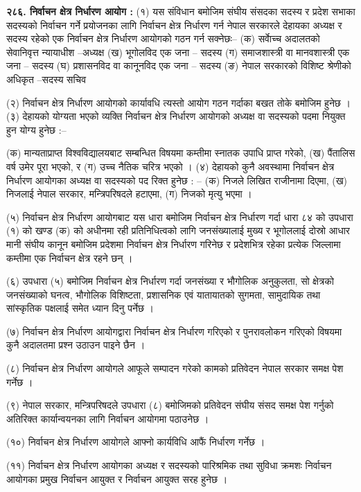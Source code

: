 \textbf{२८६. निर्वाचन क्षेत्र निर्धारण आयोग :} (१) यस संविधान बमोजिम संघीय संसदका सदस्य र प्रदेश सभाका सदस्यको निर्वाचन गर्ने प्रयोजनका लागि निर्वाचन क्षेत्र निर्धारण गर्न नेपाल सरकारले देहायका अध्यक्ष र सदस्य रहेको एक निर्वाचन क्षेत्र निर्धारण आयोगको गठन गर्न सक्नेछः–
(क) सर्वाेच्च अदालतको सेवानिवृत्त न्यायाधीश –अध्यक्ष
(ख) भूगोलविद एक जना – सदस्य
(ग) समाजशास्त्री वा मानवशास्त्री एक जना – सदस्य
(घ) प्रशासनविद वा कानूनविद एक जना – सदस्य
(ङ) नेपाल सरकारको विशिष्ट श्रेणीको अधिकृत –सदस्य सचिव

(२) निर्वाचन क्षेत्र निर्धारण आयोगको कार्यावधि त्यस्तो आयोग गठन गर्दाका बखत तोके बमोजिम हुनेछ ।
(३) देहायको योग्यता भएको व्यक्ति निर्वाचन क्षेत्र निर्धारण आयोगको अध्यक्ष वा सदस्यको पदमा नियुक्त हुन योग्य हुनेछ :–

(क) मान्यताप्राप्त विश्वविद्यालयबाट सम्बन्धित विषयमा कम्तीमा स्नातक उपाधि प्राप्त गरेको,
(ख) पैंतालिस वर्ष उमेर पूरा भएको, र
(ग) उच्च नैतिक चरित्र भएको ।
(४) देहायको कुनै अवस्थामा निर्वाचन क्षेत्र निर्धारण आयोगका अध्यक्ष वा सदस्यको पद रिक्त हुनेछ : –
(क) निजले लिखित राजीनामा दिएमा,
(ख) निजलाई नेपाल सरकार, मन्त्रिपरिषदले हटाएमा,
(ग) निजको मृत्यु भएमा ।

(५) निर्वाचन क्षेत्र निर्धारण आयोगबाट यस धारा बमोजिम निर्वाचन क्षेत्र निर्धारण गर्दा धारा ८४ को उपधारा (१) को खण्ड (क) को अधीनमा रही प्रतिनिधित्वको लागि जनसंख्यालाई मुख्य र भूगोललाई दोस्रो आधार मानी संघीय कानून बमोजिम प्रदेशमा निर्वाचन क्षेत्र निर्धारण गरिनेछ र प्रदेशभित्र रहेका प्रत्येक जिल्लामा कम्तीमा एक निर्वाचन क्षेत्र रहने छन् ।

(६) उपधारा (५) बमोजिम निर्वाचन क्षेत्र निर्धारण गर्दा जनसंख्या र भौगोलिक अनुकुलता, सो क्षेत्रको जनसंख्याको घनत्व, भौगोलिक विशिष्टता, प्रशासनिक एवं यातायातको सुगमता, सामुदायिक तथा सांस्कृतिक पक्षलाई समेत ध्यान दिनु पर्नेछ ।

(७) निर्वाचन क्षेत्र निर्धारण आयोगद्वारा निर्वाचन क्षेत्र निर्धारण गरिएको र पुनरावलोकन गरिएको विषयमा कुनै अदालतमा प्रश्न उठाउन पाइने छैन ।

(८) निर्वाचन क्षेत्र निर्धारण आयोगले आफूले सम्पादन गरेको कामको प्रतिवेदन नेपाल सरकार समक्ष पेश गर्नेछ ।

(९) नेपाल सरकार, मन्त्रिपरिषदले उपधारा (८) बमोजिमको प्रतिवेदन संघीय संसद समक्ष पेश गर्नुको अतिरिक्त कार्यान्वयनका लागि निर्वाचन आयोगमा पठाउनेछ ।

(१०) निर्वाचन क्षेत्र निर्धारण आयोगले आफ्नो कार्यविधि आफैं निर्धारण गर्नेछ ।

(११) निर्वाचन क्षेत्र निर्धारण आयोगका अध्यक्ष र सदस्यको पारिश्रमिक तथा सुविधा क्रमशः निर्वाचन आयोगका प्रमुख निर्वाचन आयुक्त र निर्वाचन आयुक्त सरह हुनेछ ।

